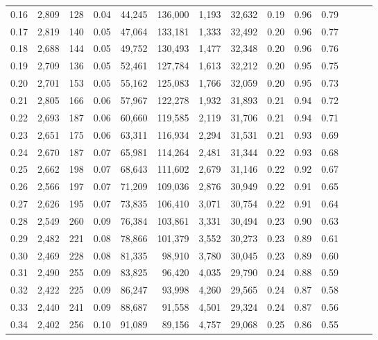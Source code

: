\begin{tabular}{rrrrrrrrrrrrrr}
0.16 &  2,809 &  128 &  0.04 &   44,245 &  136,000 &   1,193 &  32,632 &  0.19 &  0.96 &      0.79 \\
0.17 &  2,819 &  140 &  0.05 &   47,064 &  133,181 &   1,333 &  32,492 &  0.20 &  0.96 &      0.77 \\
0.18 &  2,688 &  144 &  0.05 &   49,752 &  130,493 &   1,477 &  32,348 &  0.20 &  0.96 &      0.76 \\
0.19 &  2,709 &  136 &  0.05 &   52,461 &  127,784 &   1,613 &  32,212 &  0.20 &  0.95 &      0.75 \\
0.20 &  2,701 &  153 &  0.05 &   55,162 &  125,083 &   1,766 &  32,059 &  0.20 &  0.95 &      0.73 \\
0.21 &  2,805 &  166 &  0.06 &   57,967 &  122,278 &   1,932 &  31,893 &  0.21 &  0.94 &      0.72 \\
0.22 &  2,693 &  187 &  0.06 &   60,660 &  119,585 &   2,119 &  31,706 &  0.21 &  0.94 &      0.71 \\
0.23 &  2,651 &  175 &  0.06 &   63,311 &  116,934 &   2,294 &  31,531 &  0.21 &  0.93 &      0.69 \\
0.24 &  2,670 &  187 &  0.07 &   65,981 &  114,264 &   2,481 &  31,344 &  0.22 &  0.93 &      0.68 \\
0.25 &  2,662 &  198 &  0.07 &   68,643 &  111,602 &   2,679 &  31,146 &  0.22 &  0.92 &      0.67 \\
0.26 &  2,566 &  197 &  0.07 &   71,209 &  109,036 &   2,876 &  30,949 &  0.22 &  0.91 &      0.65 \\
0.27 &  2,626 &  195 &  0.07 &   73,835 &  106,410 &   3,071 &  30,754 &  0.22 &  0.91 &      0.64 \\
0.28 &  2,549 &  260 &  0.09 &   76,384 &  103,861 &   3,331 &  30,494 &  0.23 &  0.90 &      0.63 \\
0.29 &  2,482 &  221 &  0.08 &   78,866 &  101,379 &   3,552 &  30,273 &  0.23 &  0.89 &      0.61 \\
0.30 &  2,469 &  228 &  0.08 &   81,335 &   98,910 &   3,780 &  30,045 &  0.23 &  0.89 &      0.60 \\
0.31 &  2,490 &  255 &  0.09 &   83,825 &   96,420 &   4,035 &  29,790 &  0.24 &  0.88 &      0.59 \\
0.32 &  2,422 &  225 &  0.09 &   86,247 &   93,998 &   4,260 &  29,565 &  0.24 &  0.87 &      0.58 \\
0.33 &  2,440 &  241 &  0.09 &   88,687 &   91,558 &   4,501 &  29,324 &  0.24 &  0.87 &      0.56 \\
0.34 &  2,402 &  256 &  0.10 &   91,089 &   89,156 &   4,757 &  29,068 &  0.25 &  0.86 &      0.55 \\

\end{tabular}
